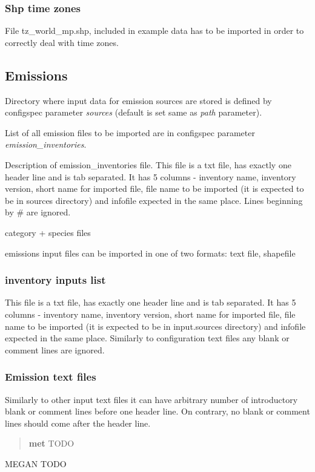 \documentclass[a4paper,11pt]{article}
\begin{document}
\subsubsection{Shp time zones}\label{shp-time-zones}

File tz\_world\_mp.shp, included in example data has to be imported in
order to correctly deal with time zones.

\subsection{Emissions}\label{emissions}

Directory where input data for emission sources are stored is defined by
configspec parameter \emph{sources} (default is set same as \emph{path}
parameter).

List of all emission files to be imported are in configspec parameter
\emph{emission\_inventories}.

Description of emission\_inventories file. This file is a txt file, has
exactly one header line and is tab separated. It has 5 columns -
inventory name, inventory version, short name for imported file, file
name to be imported (it is expected to be in sources directory) and
infofile expected in the same place. Lines beginning by \# are ignored.

category + species files

emissions input files can be imported in one of two formats: text file,
shapefile

\subsubsection{inventory inputs list}\label{inventory-inputs-list}

This file is a txt file, has exactly one header line and is tab
separated. It has 5 columns - inventory name, inventory version, short
name for imported file, file name to be imported (it is expected to be
in input.sources directory) and infofile expected in the same place.
Similarly to configuration text files any blank or comment lines are ignored.

\subsubsection{Emission text files}

Similarly to other input text files it can have arbitrary number of introductory blank or comment lines before one header line. On contrary, no blank or comment lines should come after the header line.

\begin{quote}
\textbf{met} TODO
\end{quote}

MEGAN TODO
\end{document}
